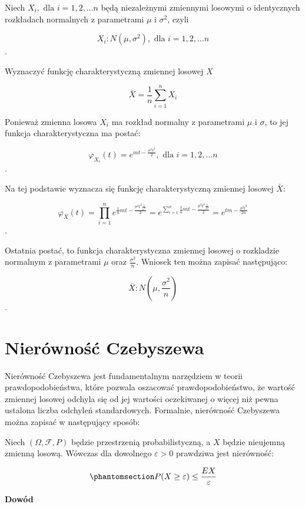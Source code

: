\documentclass[
  letterpaper,
  DIV=11,
  numbers=noendperiod]{scrreprt}
\begin{document}
Niech \(X_i, \text{ dla } i = 1, 2, \ldots n\) będą niezależnymi
zmiennymi losowymi o identycznych rozkładach normalnych z parametrami
\(\mu\) i \(\sigma^2\), czyli

\[X_i: N(\mu, \sigma^2), \text{ dla } i = 1, 2, \ldots n\].

Wyznaczyć funkcję charakterystyczną zmiennej losowej \(X\)

\[ \bar{X}=\frac{1}{n}\sum_{i=1}^nX_i\]

Ponieważ zmienna losowa \(X_i\) ma rozkład normalny z parametrami
\(\mu\) i \(\sigma\), to jej funkcja charakterystyczna ma postać:

\[\varphi_{X_i}(t)  = e^{mt-\frac{\sigma^2t^2}{2}}, \text{ dla } i = 1, 2, \ldots n\].

Na tej podstawie wyznacza się funkcję charakterystyczną zmiennej losowej
\(\bar{X}\):

\[\varphi_\bar{X}(t)  = \prod_{i=1}^ne^{\frac{1}{n}mt-\frac{\sigma^2t^2\frac{1}{n^2}}{2}}= e^{\sum_{i=1}^n{\frac{1}{n}mt-\frac{\sigma^2t^2\frac{1}{n^2}}{2}}}=e^{{tm}-\frac{\sigma^2t^2}{2n}}\].

Ostatnia postać, to funkcja charakterystyczna zmiennej losowej o
rozkladzie normalnym z parametrami \(\mu\) oraz \(\frac{\sigma^2}{n}\).
Wniosek ten można zapisać następująco:

\[\overline{X}: N\left(\mu,\frac{\sigma^2}{n} \right)\].

\section{Nierówność Czebyszewa}\label{nieruxf3wnoux15bux107-czebyszewa}

Nierówność Czebyszewa jest fundamentalnym narzędziem w teorii
prawdopodobieństwa, które pozwala oszacować prawdopodobieństwo, że
wartość zmiennej losowej odchyla się od jej wartości oczekiwanej o
więcej niż pewna ustalona liczba odchyleń standardowych. Formalnie,
nierówność Czebyszewa można zapisać w następujący sposób:

Niech \((\Omega,\mathcal{F},P)\) będzie przestrzenią probabilistyczną, a
\(X\) będzie nieujemną zmienną losową. Wówczas dla dowolnego
\(\varepsilon > 0\) prawdziwa jest nierówność:

\begin{equation}\phantomsection\label{eq-Czeb}{ P(X \ge \varepsilon) \le \frac{EX}{\varepsilon}}\end{equation}

\textbf{Dowód}
\end{document}
